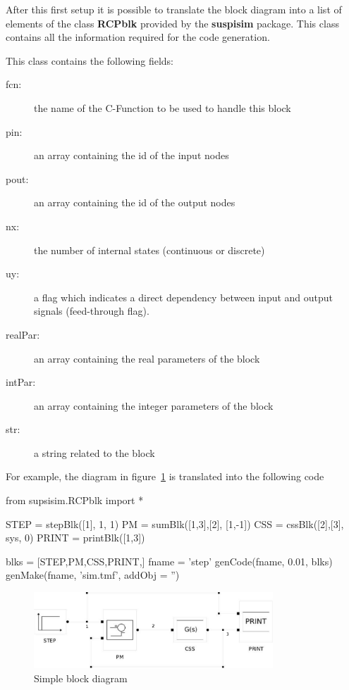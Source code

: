 After this first setup it is possible to translate the block diagram into a 
list of elements of the class \textbf{RCPblk} provided by the 
\textbf{suspisim} package. This class contains all the information required 
for the code generation.

This class contains the following fields:

\begin{description}
\item[fcn:] the name of the C-Function to be used to handle this block
\item [pin:] an array containing the id of the input nodes
\item [pout:] an array containing the id of the output nodes
\item [nx:] the number of internal states (continuous or discrete)
\item [uy:] a flag which indicates a direct dependency between input and 
output signals (feed-through flag).
\item [realPar:] an array containing the real parameters of the block
\item [intPar:] an array containing the integer parameters of the block
\item [str:] a string related to the block
\end{description}

For example, the diagram in figure~\ref{F18} is translated into the following 
code

\begin{code}
from supsisim.RCPblk import *

STEP = stepBlk([1],  1,  1)
PM = sumBlk([1,3],[2],  [1,-1])
CSS = cssBlk([2],[3],  sys,  0)
PRINT = printBlk([1,3])

blks = [STEP,PM,CSS,PRINT,]
fname = 'step'
genCode(fname, 0.01, blks)
genMake(fname, 'sim.tmf', addObj = '')
\end{code}



\begin{figure}[htbp]	%
\centering
\includegraphics[width=0.8\textwidth]{eps/step1.eps}
\caption{Simple block diagram}
\label{F18}
\end{figure}

